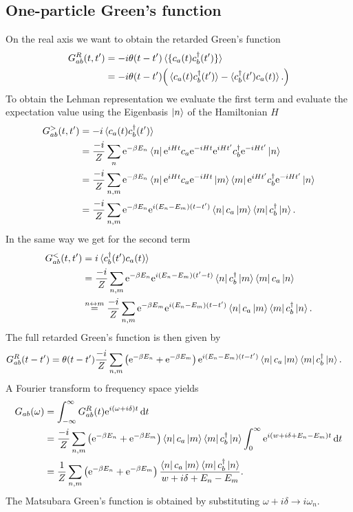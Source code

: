 \documentclass[12pt,a4paper]{scrartcl}
\numberwithin{equation}{section}
\renewcommand{\exp}[1]{\mathrm{e}^{#1}}
\begin{document}
\subsection{One-particle Green's function}
On the real axis we want to obtain the retarded Green's function
\begin{align}
 G^R_{ab}(t,t') &= -i\theta(t-t') \braket{\{ c_a(t) c^{\dagger}_b(t') \} } \\
  &= -i\theta(t-t') \Big(
   \braket{c_a(t) c^{\dagger}_b(t') } - \braket{c^{\dagger}_b(t') c_a(t)  }.
   \Big)
\end{align}
To obtain the Lehman representation we evaluate the first term and evaluate
the expectation value using the Eigenbasis $\ket{n}$ of the Hamiltonian $H$
\begin{align}
 G^>_{ab}(t,t') 
  &= -i \braket{c_a(t) c^{\dagger}_b(t') } \\
  &= \frac{-i}{Z} \sum_n \exp{-\beta E_n} \bra{n} \exp{iHt} c_a \exp{-iHt} \exp{iHt'}c^{\dagger}_b\exp{-iHt'}  \ket{n} \\
  &= \frac{-i}{Z} \sum_{n,m} \exp{-\beta E_n} \bra{n} \exp{iHt} c_a \exp{-iHt} \ket{m}\bra{m} \exp{iHt'}c^{\dagger}_b\exp{-iHt'}  \ket{n} \\
  &= \frac{-i}{Z} \sum_{n,m} \exp{-\beta E_n}\exp{i(E_n-E_m)(t-t')} \bra{n} c_a \ket{m}\bra{m} c^{\dagger}_b \ket{n}.
  \end{align}
In the same way we get for the second term
\begin{align}
 G^<_{ab}(t,t') 
  &= i \braket{c^{\dagger}_b(t') c_a(t)  } \\
  &= \frac{-i}{Z} \sum_{n,m} \exp{-\beta E_n}\exp{i(E_n-E_m)(t'-t)} \bra{n} c^{\dagger}_b \ket{m}\bra{m} c_a \ket{n} \\
  &\stackrel{n\leftrightarrow m}{=} \frac{-i}{Z} \sum_{n,m} \exp{-\beta E_m}\exp{i(E_n-E_m)(t-t')} \bra{n} c_a \ket{m}\bra{m} c^{\dagger}_b \ket{n}.
\end{align}
The full retarded Green's function is then given by
\begin{align}
 G^R_{ab}(t-t') 
&=  \theta(t-t') \frac{-i}{Z} \sum_{n,m} \left( \exp{-\beta E_n} + \exp{-\beta E_m} \right) \exp{i(E_n-E_m)(t-t')} \bra{n} c_a \ket{m}\bra{m} c^{\dagger}_b \ket{n}.
 \end{align}
A Fourier transform to frequency space yields
\begin{align}
 G_{ab}(\omega) 
 &= \int_{-\infty}^{\infty} G^R_{ab}(t) \exp{i(\omega+i\delta)t}  \, \mathrm{d}t \\
 &= \frac{-i}{Z} \sum_{n,m} \left( \exp{-\beta E_n} + \exp{-\beta E_m} \right) \bra{n} c_a \ket{m}\bra{m} c^{\dagger}_b \ket{n}
     \int_{0}^{\infty} \exp{i(w+i\delta+E_n-E_m)t}   \, \mathrm{d}t \\
&= \frac{1}{Z} \sum_{n,m} \left( \exp{-\beta E_n} + \exp{-\beta E_m} \right) 
  \frac{ \bra{n} c_a \ket{m}\bra{m} c^{\dagger}_b \ket{n} }{w+i\delta+E_n-E_m}.
\end{align}
The Matsubara Green's function is obtained by substituting $\omega+i\delta \rightarrow i\omega_n$.
\end{document}
